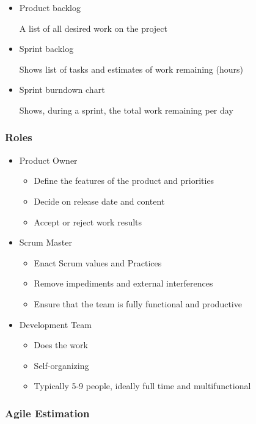 \documentclass[../ESOF_notes.tex]{subfiles}
\begin{document}
\begin{itemize}
    \item Product backlog
    
    A list of all desired work on the project
    \item Sprint backlog
    
    Shows list of tasks and estimates of work remaining (hours)
    \item Sprint burndown chart
    
    Shows, during a sprint, the total work remaining per day
\end{itemize}

\subsubsection{Roles}

\begin{itemize}
    \item Product Owner
    \begin{itemize}
        \item Define the features of the product and priorities
        \item Decide on release date and content
        \item Accept or reject work results
    \end{itemize}

    \item Scrum Master
    \begin{itemize}
        \item Enact Scrum values and Practices
        \item Remove impediments and external interferences
        \item Ensure that the team is fully functional and productive
    \end{itemize}
    
    \item Development Team
    \begin{itemize}
        \item Does the work
        \item Self-organizing
        \item Typically 5-9 people, ideally full time and multifunctional
    \end{itemize}
\end{itemize}

\subsubsection{Agile Estimation}
\end{document}
